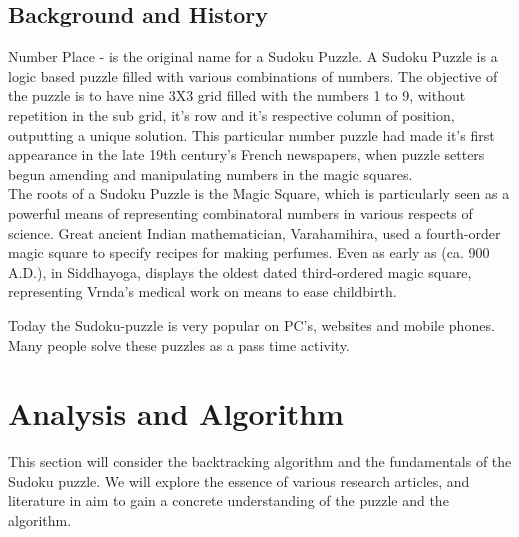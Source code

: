\documentclass[12pt]{article}
\begin{document}
\subsection{Background and History}
\begin{flushleft}
Number Place - is the original name for a Sudoku Puzzle.
A Sudoku Puzzle is a logic based puzzle filled with various combinations of numbers. The objective of the puzzle is to have nine 3X3 grid filled with the numbers 1 to 9, without repetition in the sub grid, it's row and it's respective column of position, outputting a unique solution. This particular number puzzle had made it's first appearance in the late 19th century's French newspapers, when puzzle setters begun amending and manipulating numbers in the magic squares. 
\\
The roots of a Sudoku Puzzle is the Magic Square, which is particularly seen as a powerful means of representing combinatoral numbers in various respects of science. Great ancient Indian mathematician, Varahamihira, used a fourth-order magic square to specify recipes for making perfumes. Even as early as (ca. 900 A.D.), in Siddhayoga, displays the oldest dated third-ordered magic square, representing Vrnda's medical work on means to ease childbirth.
\end{flushleft}

\begin{flushleft}
Today the Sudoku-puzzle is very popular on PC's, websites and mobile phones. Many people solve these puzzles as a pass time activity.
\end{flushleft}

\section{Analysis and Algorithm}
This section will consider the backtracking algorithm and the fundamentals of the Sudoku puzzle. We will explore the essence of various research articles, and literature in aim to gain a concrete understanding of the puzzle and the algorithm. 
\end{document}
